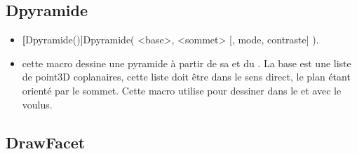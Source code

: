 \subsection{Dpyramide}
\begin{itemize}
 \item \util \textbf[Dpyramide()]{Dpyramide( <base>, <sommet> [, mode, contraste] )}.
 \item \desc cette macro dessine une pyramide à partir de sa  et du . La base est une liste de point3D coplanaires, cette liste doit être dans le sens direct, le plan étant orienté par le sommet. Cette macro utilise  pour dessiner dans le  et avec le  voulus.
\end{itemize}

\subsection{DrawFacet}\label{macDrawFacet}
